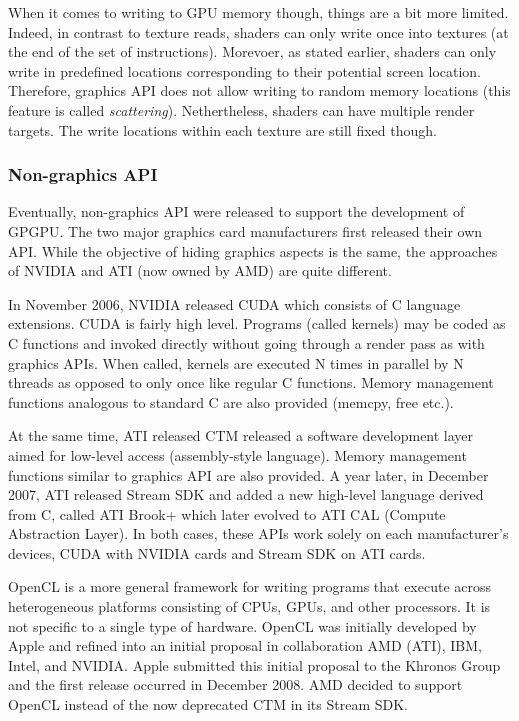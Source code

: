 When it comes to writing to GPU memory though, things are a bit more limited. Indeed, in contrast to texture reads, shaders can only write once into textures (at the end of the set of instructions). Morevoer, as stated earlier, shaders can only write in predefined locations corresponding to their potential screen location. Therefore, graphics API does not allow writing to random memory locations (this feature is called \emph{scattering}). Nethertheless, shaders can have multiple render targets. The write locations within each texture are still fixed though. 

		
		\subsubsection*{Non-graphics API}
Eventually, non-graphics API were released to support the development of GPGPU. The two major graphics card manufacturers first released their own API. While the objective of hiding graphics aspects is the same, the approaches of NVIDIA and ATI (now owned by AMD) are quite different. 

In November 2006, NVIDIA released CUDA which consists of C language extensions. CUDA is fairly high level. Programs (called kernels) may be coded as C functions and invoked directly without going through a render pass as with graphics APIs. When called, kernels are executed N times in parallel by N threads as opposed to only once like regular C functions. Memory management functions analogous to standard C are also provided (memcpy, free etc.). 

At the same time, ATI released CTM released a software development layer aimed for low-level access (assembly-style language). Memory management functions similar to graphics API are also provided. A year later, in December 2007, ATI released Stream SDK and added a new high-level language derived from C, called ATI Brook+ which later evolved to ATI CAL (Compute Abstraction Layer). In both cases, these APIs work solely on each manufacturer's devices, CUDA with NVIDIA cards and Stream SDK on ATI cards. 

OpenCL is a more general framework for writing programs that execute across heterogeneous platforms consisting of CPUs, GPUs, and other processors. It is not specific to a single type of hardware. OpenCL was initially developed by Apple and refined into an initial proposal in collaboration AMD (ATI), IBM, Intel, and NVIDIA. Apple submitted this initial proposal to the Khronos Group and the first release occurred in December 2008. AMD decided to support OpenCL instead of the now deprecated CTM in its Stream SDK. 

